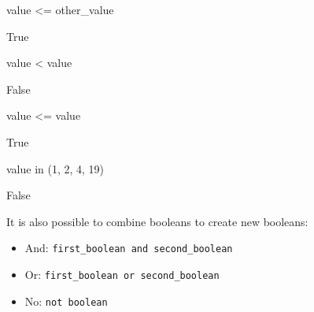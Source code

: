 \begin{pyin}
value <= other_value
\end{pyin}





\begin{raw}
True
\end{raw}







\begin{pyin}
value < value
\end{pyin}





\begin{raw}
False
\end{raw}







\begin{pyin}
value <= value
\end{pyin}





\begin{raw}
True
\end{raw}







\begin{pyin}
value in (1, 2, 4, 19)
\end{pyin}





\begin{raw}
False
\end{raw}





It is also possible to combine booleans to create new booleans:
\begin{itemize}
\item 

And: \texttt{first\_boolean and second\_boolean}

\item 

Or: \texttt{first\_boolean or second\_boolean}

\item 

No: \texttt{not boolean}

\end{itemize}




